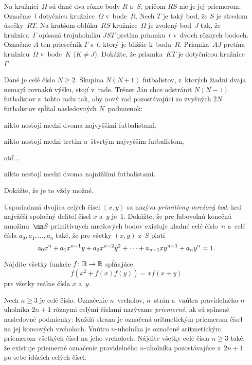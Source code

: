 {%
Na kružnici~$\Omega$ sú dané dva rôzne body $R$ a~$S$, pričom $RS$ nie je jej priemerom. Označme~$l$ dotyčnicu kružnice~$\Omega$ v~bode~$R$. Nech $T$ je taký bod, že $S$ je stredom úsečky~$RT$. Na kratšom oblúku~$RS$ kružnice~$\Omega$ je zvolený bod~$J$ tak, že kružnica~$\Gamma$ opísaná trojuholníku  $JST$ pretína priamku~$l$ v~dvoch rôznych bodoch. Označme $A$ ten priesečník $\Gamma$ s~$l$, ktorý je bližšie k~bodu~$R$. Priamka~$AJ$ pretína kružnicu~$\Omega$ v~bode~$K$ ($K\ne J$). Dokážte, že priamka~$KT$ je dotyčnicou kružnice~$\Gamma$.}

{%
Dané je celé číslo $N \ge 2$. Skupina $N(N+1)$ futbalistov, z~ktorých žiadni dvaja nemajú rovnakú výšku, stojí v~rade. Tréner Ján chce odstrániť $N(N-1)$ futbalistov z~tohto radu tak, aby nový rad pozostávajúci zo zvyšných $2N$ futbalistov spĺňal nasledovných $N$~podmienok:
\item nikto nestojí medzi dvoma najvyššími futbalistami,
\item nikto nestojí medzi tretím a~štvrtým najvyšším futbalistom,
\item atď...
\item nikto nestojí medzi dvoma najnižšími futbalistami.

Dokážte, že je to vždy možné.}

{%
Usporiadaná dvojica celých čísel $(x,y)$  sa nazýva {\it primitívny mrežový bod}, keď najväčší spoločný deliteľ čísel $x$ a~$y$ je~$1$. Dokážte, že pre ľubovoľnú konečnú množinu~$\mn S$ primitívnych mrežových bodov existuje kladné celé číslo~$n$ a~celé čísla $a_0,a_1,\dots,a_n$ také, že pre všetky $(x,y)$ z~$S$ platí
$$
\postdisplaypenalty=10000
a_0 x^n + a_1 x^{n-1} y + a_2 x^{n-2} y^2 + \cdots + a_{n-1} x y^{n-1} + a_n y^n = 1.
$$}

{%
Nájdite všetky funkcie $f \colon \Bbb{R} \to \Bbb{R}$ spĺňajúce
$$
f(x^2+f(x)f(y))=x f(x+y)
$$
pre všetky reálne čísla $x$ a~$y$.
}

{%
Nech $n \ge 3$ je celé číslo. Označenie $n$~vrcholov, $n$~strán a~vnútra pravidelného $n$-uholníka $2n+1$ rôznymi celými číslami nazývame {\it priemerné}, ak sú splnené nasledovné podmienky:
\ite{$\bullet$} Každá strana je označená aritmetickým priemerom čísel na jej koncových vrcholoch.
\ite{$\bullet$} Vnútro $n$-uholníka je označené aritmetickým priemerom všetkých čísel na jeho vrcholoch.
\endgraf\noindent
Nájdite všetky celé čísla $n \ge 3$ také, že existuje priemerné označenie pravidelného $n$-uholníka pozostávajúce z~$2n+1$ po sebe idúcich celých čísel.
}

